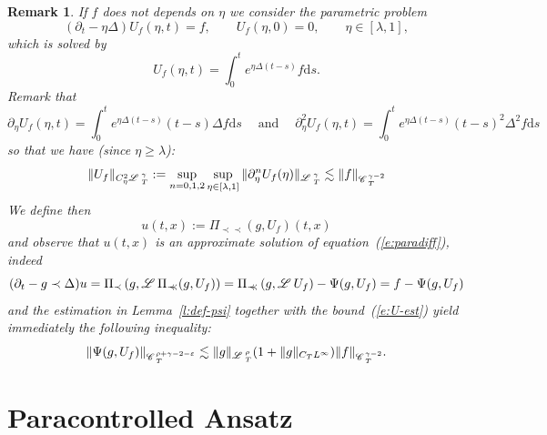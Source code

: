 \documentclass[11pt,reqno]{amsart}
\newcommand{\assign}{:=}
\newcommand{\mathd}{\mathrm{d}}
\newcommand{\precprec}{\prec\!\!\!\prec}
\newcommand{\tmop}[1]{\ensuremath{\operatorname{#1}}}
\newtheorem{remark}[theorem]{Remark}
\newcommand{\CC}{\mathscr{C} \hspace{.1em}}
\newcommand{\LL}{\mathscr{L} \hspace{.2em}}
\begin{document}
\begin{remark}
  If $f$ does not depends on $\eta$ we consider the parametric problem
  \begin{equation}
    (\partial_t - \eta \Delta) U_f (\eta, t) = f, \qquad U_f (\eta, 0) = 0,
    \qquad \eta \in [\lambda, 1], \label{e:def-U}
  \end{equation}
  which is solved by
  \[ U_f (\eta, t) = \int_0^t e^{\eta \Delta (t - s)} f \mathd s. \]
  Remark that
  \[ \partial_{\eta} U_f (\eta, t) = \int_0^t e^{\eta \Delta (t - s)} (t - s)
     \Delta f \mathd s \quad \tmop{and} \quad \partial_{\eta}^2 U_f (\eta, t)
     = \int_0^t e^{\eta \Delta (t - s)} (t - s)^2 \Delta^2 f \mathd s \]
  so that we have (since $\eta \geqslant \lambda$):
  \begin{equation}
    \| U_f \|_{C_{\eta}^2 \LL^{\gamma}_T} \assign \sup_{n = 0, 1, 2}
    \sup_{\eta \in [\lambda, 1]} \| \partial_{\eta}^n U_f (\eta)
    \|_{\LL_T^{\gamma}} \lesssim \| f \|_{\CC^{\gamma - 2}_T}  \label{e:U-est}
  \end{equation}
  We define then
  \begin{equation}
    u (t, x) \assign \Pi_{\precprec} (g, U_f) (t, x) \label{e:def-u}
  \end{equation}
  and observe that $u (t, x)$ is an approximate solution of
  equation~(\ref{e:paradiff}), indeed
  \[ (\partial_t - g \prec \Delta) u = \Pi_{\prec} \left( g, \LL
     \Pi_{\precprec} (g, U_f) \right) = \Pi_{\precprec} \left( g, \LL U_f
     \right) - \Psi (g, U_f) = f - \Psi (g, U_f) \]
  and the estimation in Lemma~\ref{l:def-psi} together with the
  bound~(\ref{e:U-est}) yield immediately the following inequality:
  \begin{equation}
    \| \Psi (g, U_f) \|_{\CC^{\rho + \gamma - 2 - \varepsilon}_T} \lesssim \|
    g \|_{\LL^{\rho}_T} (1 + \| g \|_{C_T L^{\infty}}) \| f \|_{\CC^{\gamma -
    2}_T} . \label{e:psi-est2}
  \end{equation}
\end{remark}

\section{Paracontrolled Ansatz\label{s:paracontrolled}}
\end{document}
